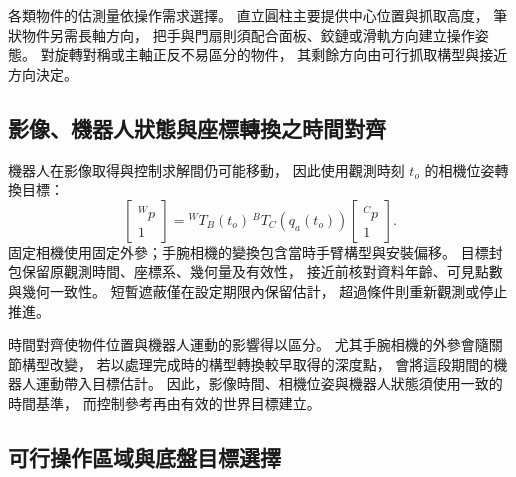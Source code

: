 各類物件的估測量依操作需求選擇。
直立圓柱主要提供中心位置與抓取高度，
筆狀物件另需長軸方向，
把手與門扇則須配合面板、鉸鏈或滑軌方向建立操作姿態。
對旋轉對稱或主軸正反不易區分的物件，
其剩餘方向由可行抓取構型與接近方向決定。

\subsection{影像、機器人狀態與座標轉換之時間對齊}
\label{subsec:visual_state_time_alignment}

機器人在影像取得與控制求解間仍可能移動，
因此使用觀測時刻 $t_o$ 的相機位姿轉換目標：
\begin{equation}
    \begin{bmatrix}{}^Wp\\1\end{bmatrix}
    ={}^WT_B(t_o)\,{}^BT_C(q_a(t_o))
    \begin{bmatrix}{}^Cp\\1\end{bmatrix}.
    \label{eq:ch3_visual_timestamp_transform}
\end{equation}
固定相機使用固定外參；手腕相機的變換包含當時手臂構型與安裝偏移。
目標封包保留原觀測時間、座標系、幾何量及有效性，
接近前核對資料年齡、可見點數與幾何一致性。
短暫遮蔽僅在設定期限內保留估計，
超過條件則重新觀測或停止推進。

時間對齊使物件位置與機器人運動的影響得以區分。
尤其手腕相機的外參會隨關節構型改變，
若以處理完成時的構型轉換較早取得的深度點，
會將這段期間的機器人運動帶入目標估計。
因此，影像時間、相機位姿與機器人狀態須使用一致的時間基準，
而控制參考再由有效的世界目標建立。

\subsection{可行操作區域與底盤目標選擇}
\label{subsec:feasible_operation_base_selection}

